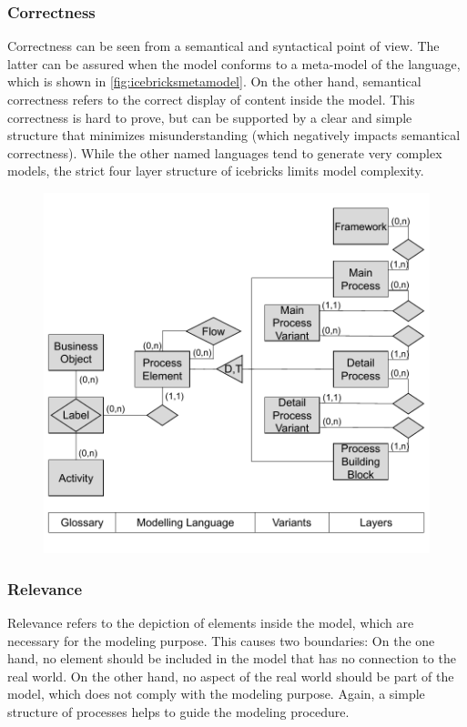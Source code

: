 	 
	 \subsubsection{Correctness}
	 Correctness can be seen from a semantical and syntactical point of view. The latter can be assured when the model conforms to a meta-model of the language, which is shown in \Fig \ref{fig:icebricksmetamodel}. On the other hand, semantical correctness refers to the correct display of content inside the model. This correctness is hard to prove, but can be supported by a clear and simple structure that minimizes misunderstanding (which negatively impacts semantical correctness). While the other named languages tend to generate very complex models, the strict four layer structure of icebricks limits model complexity. 
	 
	 	 \begin{figure}[caption={icebricks Meta Model}, label={fig:icebricksmetamodel}]
	 	{	\includegraphics[width=.8\textwidth]{figures/icebricksmetamodel.pdf} \\ \parbox{0.8\textwidth}{}
 	}
	 
	 \end{figure} 
 
	 \subsubsection{Relevance}
	 Relevance refers to the depiction of elements inside the model, which are necessary for the modeling purpose. This causes two boundaries: On the one hand, no element should be included in the model that has no connection to the real world. On the other hand, no aspect of the real world should be part of the model, which does not comply with the modeling purpose. Again, a simple structure of processes helps to guide the modeling procedure. 
	 

